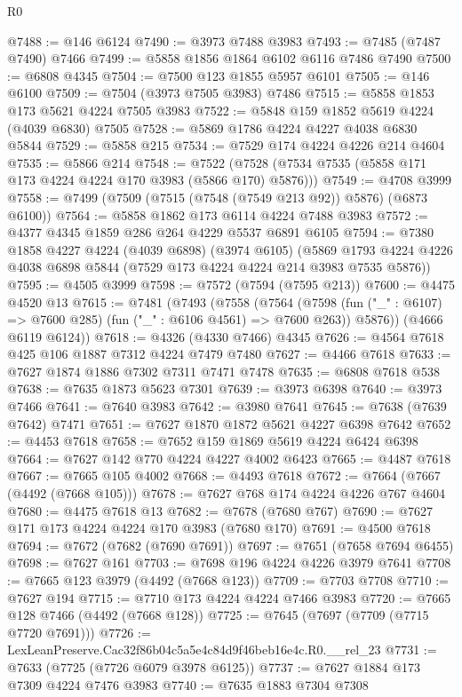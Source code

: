 \begin{lexlean}{R0}
\begin{coremodule}
@7488 := @146 @6124
@7490 := @3973 @7488 @3983
@7493 := @7485 (@7487 @7490) @7466
@7499 := @5858 @1856 @1864 @6102 @6116 @7486 @7490
@7500 := @6808 @4345
@7504 := @7500 @123 @1855 @5957 @6101
@7505 := @146 @6100
@7509 := @7504 (@3973 @7505 @3983) @7486
@7515 := @5858 @1853 @173 @5621 @4224 @7505 @3983
@7522 := @5848 @159 @1852 @5619 @4224 (@4039 @6830) @7505
@7528 := @5869 @1786 @4224 @4227 @4038 @6830 @5844
@7529 := @5858 @215
@7534 := @7529 @174 @4224 @4226 @214 @4604
@7535 := @5866 @214
@7548 := @7522 (@7528 (@7534 @7535 (@5858 @171 @173 @4224 @4224 @170 @3983 (@5866 @170) @5876)))
@7549 := @4708 @3999
@7558 := @7499 (@7509 (@7515 (@7548 (@7549 @213 @92)) @5876) (@6873 @6100))
@7564 := @5858 @1862 @173 @6114 @4224 @7488 @3983
@7572 := @4377 @4345 @1859 @286 @264 @4229 @5537 @6891 @6105
@7594 := @7380
    @1858
    @4227
    @4224
    (@4039 @6898)
    (@3974 @6105)
    (@5869 @1793 @4224 @4226 @4038 @6898 @5844 (@7529 @173 @4224 @4224 @214 @3983 @7535 @5876))
@7595 := @4505 @3999
@7598 := @7572 (@7594 (@7595 @213))
@7600 := @4475 @4520 @13
@7615 := @7481
    (@7493
      (@7558
        (@7564
          (@7598 (fun ("_" : @6107) => @7600 @285) (fun ("_" : @6106 @4561) => @7600 @263))
          @5876))
      (@4666 @6119 @6124))
@7618 := @4326 (@4330 @7466) @4345
@7626 := @4564 @7618 @425 @106 @1887 @7312 @4224 @7479 @7480
@7627 := @4466 @7618
@7633 := @7627 @1874 @1886 @7302 @7311 @7471 @7478
@7635 := @6808 @7618 @538
@7638 := @7635 @1873 @5623 @7301
@7639 := @3973 @6398
@7640 := @3973 @7466
@7641 := @7640 @3983
@7642 := @3980 @7641
@7645 := @7638 (@7639 @7642) @7471
@7651 := @7627 @1870 @1872 @5621 @4227 @6398 @7642
@7652 := @4453 @7618
@7658 := @7652 @159 @1869 @5619 @4224 @6424 @6398
@7664 := @7627 @142 @770 @4224 @4227 @4002 @6423
@7665 := @4487 @7618
@7667 := @7665 @105 @4002
@7668 := @4493 @7618
@7672 := @7664 (@7667 (@4492 (@7668 @105)))
@7678 := @7627 @768 @174 @4224 @4226 @767 @4604
@7680 := @4475 @7618 @13
@7682 := @7678 (@7680 @767)
@7690 := @7627 @171 @173 @4224 @4224 @170 @3983 (@7680 @170)
@7691 := @4500 @7618
@7694 := @7672 (@7682 (@7690 @7691))
@7697 := @7651 (@7658 @7694 @6455)
@7698 := @7627 @161
@7703 := @7698 @196 @4224 @4226 @3979 @7641
@7708 := @7665 @123 @3979 (@4492 (@7668 @123))
@7709 := @7703 @7708
@7710 := @7627 @194
@7715 := @7710 @173 @4224 @4224 @7466 @3983
@7720 := @7665 @128 @7466 (@4492 (@7668 @128))
@7725 := @7645 (@7697 (@7709 (@7715 @7720 @7691)))
@7726 := LexLeanPreserve.Cac32f86b04c5a5e4c84d9f46beb16e4c.R0.__rel_23
@7731 := @7633 (@7725 (@7726 @6079 @3978 @6125))
@7737 := @7627 @1884 @173 @7309 @4224 @7476 @3983
@7740 := @7635 @1883 @7304 @7308

\end{coremodule}
\end{lexlean}
